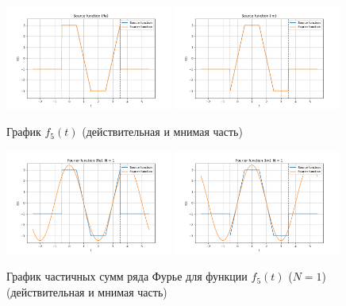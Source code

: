 \begin{figure}[ht!]
    \centering
    \includegraphics[width=0.49\textwidth]{media/plots/func_5_real.png}
    \includegraphics[width=0.49\textwidth]{media/plots/func_5_imag.png}
    \caption{График  $f_5(t)$ (действительная и мнимая часть)}
    \label{fig:func_5_re_im}
\end{figure}


\begin{figure}[ht!]
    \centering
    \includegraphics[width=0.49\textwidth]{media/plots/func_5_real_N_1.png}
    \includegraphics[width=0.49\textwidth]{media/plots/func_5_imag_N_1.png}
    \caption{График частичных сумм ряда Фурье для функции $f_5(t)$ ($N = 1$) (действительная и мнимая часть)}
    \label{fig:func_5_fourier_re_im_N_1}
\end{figure}

